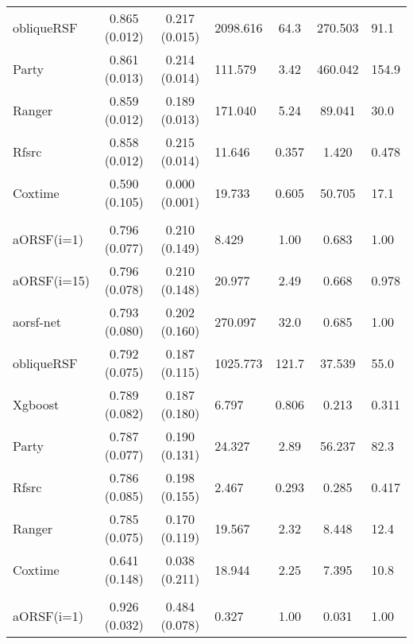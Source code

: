 \documentclass[twoside,11pt]{article}\usepackage[]{graphicx}\usepackage[]{color}
\newenvironment{knitrout}{}{} %
\begin{document}
\begin{knitrout}
\begin{longtable}{lcclccl}
\hspace{1em}obliqueRSF & 0.865 (0.012) & 0.217 (0.015) & 2098.616 & 64.3 & 270.503 & 91.1\\
\hspace{1em}Party & 0.861 (0.013) & 0.214 (0.014) & 111.579 & 3.42 & 460.042 & 154.9\\
\hspace{1em}Ranger & 0.859 (0.012) & 0.189 (0.013) & 171.040 & 5.24 & 89.041 & 30.0\\
\hspace{1em}Rfsrc & 0.858 (0.012) & 0.215 (0.014) & 11.646 & 0.357 & 1.420 & 0.478\\
\hspace{1em}Coxtime & 0.590 (0.105) & 0.000 (0.001) & 19.733 & 0.605 & 50.705 & 17.1\\
\addlinespace[0.3em]
\hline
\multicolumn{7}{l}{\textit{\textbf{nafld}}}\\
\hline
\hspace{1em}aORSF(i=1) & 0.796 (0.077) & 0.210 (0.149) & 8.429 & 1.00 & 0.683 & 1.00\\
\hspace{1em}aORSF(i=15) & 0.796 (0.078) & 0.210 (0.148) & 20.977 & 2.49 & 0.668 & 0.978\\
\hspace{1em}aorsf-net & 0.793 (0.080) & 0.202 (0.160) & 270.097 & 32.0 & 0.685 & 1.00\\
\hspace{1em}obliqueRSF & 0.792 (0.075) & 0.187 (0.115) & 1025.773 & 121.7 & 37.539 & 55.0\\
\hspace{1em}Xgboost & 0.789 (0.082) & 0.187 (0.180) & 6.797 & 0.806 & 0.213 & 0.311\\
\hspace{1em}Party & 0.787 (0.077) & 0.190 (0.131) & 24.327 & 2.89 & 56.237 & 82.3\\
\hspace{1em}Rfsrc & 0.786 (0.085) & 0.198 (0.155) & 2.467 & 0.293 & 0.285 & 0.417\\
\hspace{1em}Ranger & 0.785 (0.075) & 0.170 (0.119) & 19.567 & 2.32 & 8.448 & 12.4\\
\hspace{1em}Coxtime & 0.641 (0.148) & 0.038 (0.211) & 18.944 & 2.25 & 7.395 & 10.8\\
\addlinespace[0.3em]
\hline
\multicolumn{7}{l}{\textit{\textbf{Overall}}}\\
\hline
\hspace{1em}aORSF(i=1) & 0.926 (0.032) & 0.484 (0.078) & 0.327 & 1.00 & 0.031 & 1.00\\

\end{longtable}
\end{knitrout}
\end{document}
